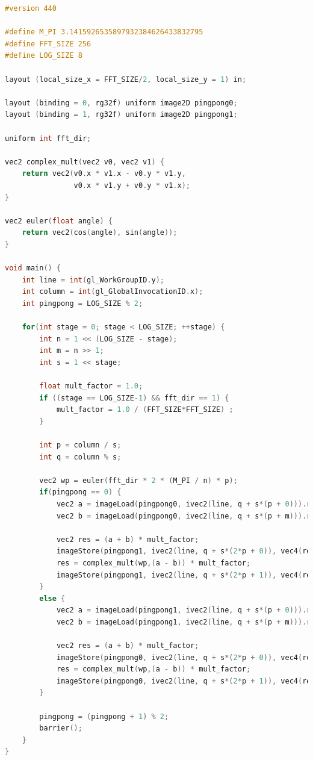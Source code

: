 \documentclass[
  oneside,
  11pt, a4paper,
  footinclude=true,
  headinclude=true,
  cleardoublepage=empty
]{scrbook}
\begin{document}
\begin{lstlisting}[language=C, caption={FFT Radix-2 Stockham Vertical unique pass, see \autoref{subsec:radix2-stockham}}, label={lst:glsl-radix2-stockham-vertical}]
#version 440

#define M_PI 3.1415926535897932384626433832795
#define FFT_SIZE 256
#define LOG_SIZE 8

layout (local_size_x = FFT_SIZE/2, local_size_y = 1) in;

layout (binding = 0, rg32f) uniform image2D pingpong0;
layout (binding = 1, rg32f) uniform image2D pingpong1;

uniform int fft_dir;

vec2 complex_mult(vec2 v0, vec2 v1) {
	return vec2(v0.x * v1.x - v0.y * v1.y,
				v0.x * v1.y + v0.y * v1.x);
}

vec2 euler(float angle) {
	return vec2(cos(angle), sin(angle));
}

void main() {
	int line = int(gl_WorkGroupID.y);
	int column = int(gl_GlobalInvocationID.x);
    int pingpong = LOG_SIZE % 2;

    for(int stage = 0; stage < LOG_SIZE; ++stage) {
        int n = 1 << (LOG_SIZE - stage);
        int m = n >> 1;
        int s = 1 << stage;

	    float mult_factor = 1.0;
	    if ((stage == LOG_SIZE-1) && fft_dir == 1) {
	    	mult_factor = 1.0 / (FFT_SIZE*FFT_SIZE) ;
	    }

        int p = column / s;
        int q = column % s;

        vec2 wp = euler(fft_dir * 2 * (M_PI / n) * p);
        if(pingpong == 0) {
            vec2 a = imageLoad(pingpong0, ivec2(line, q + s*(p + 0))).rg;
            vec2 b = imageLoad(pingpong0, ivec2(line, q + s*(p + m))).rg;

            vec2 res = (a + b) * mult_factor;
            imageStore(pingpong1, ivec2(line, q + s*(2*p + 0)), vec4(res,0,0));
            res = complex_mult(wp,(a - b)) * mult_factor;
            imageStore(pingpong1, ivec2(line, q + s*(2*p + 1)), vec4(res,0,0));
        }
        else {
            vec2 a = imageLoad(pingpong1, ivec2(line, q + s*(p + 0))).rg;
            vec2 b = imageLoad(pingpong1, ivec2(line, q + s*(p + m))).rg;

            vec2 res = (a + b) * mult_factor;
            imageStore(pingpong0, ivec2(line, q + s*(2*p + 0)), vec4(res,0,0));
            res = complex_mult(wp,(a - b)) * mult_factor;
            imageStore(pingpong0, ivec2(line, q + s*(2*p + 1)), vec4(res,0,0));
        }

        pingpong = (pingpong + 1) % 2;
        barrier();
    }
}
\end{lstlisting}
\end{document}
